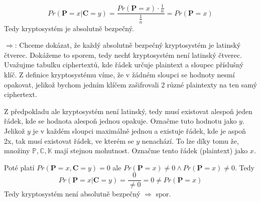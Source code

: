\documentclass[12pt, a4paper]{article}
\begin{document}
\[
Pr(\mathbf{P}=x \vert \mathbf{C}=y) = \frac{Pr(\mathbf{P}=x) \cdot \frac{1}{n}}{\frac{1}{n}} = Pr(\mathbf{P}=x)
\]
Tedy kryptosystém je absolutně bezpečný.

$\Rightarrow$: Chceme dokázat, že každý absolutně bezpečný kryptosystém je latinský čtverec. Dokážeme to sporem, tedy nechť kryptosystém není latinský čtverec. Uvažujme tabulku ciphertextů, kde řádek určuje plaintext a sloupec příslušný klíč. Z definice kryptosystému víme, že v žádném sloupci se hodnoty nesmí opakovat, jelikož bychom jedním klíčem zašifrovali 2 různé plaintexty na ten samý ciphertext.

Z předpokladu ale kryptosystém není latinský, tedy musí existovat alespoň jeden řádek, kde se hodnota alespoň jednou opakuje. Označme tuto hodnotu jako $y$. Jelikož $y$ je v každém sloupci maximálně jednou a existuje řádek, kde je aspoň 2x, tak musí existovat řádek, ve kterém se $y$ nenachází. To lze díky tomu že, množiny $\mathbb{P}, \mathbb{C}, \mathbb{K}$ mají stejnou mohutnost. Označme tento řádek (plaintext) jako $x$.

Poté platí $Pr(\mathbf{P}=x, \mathbf{C}=y) = 0$ ale  $Pr(\mathbf{P}=x) \neq 0 \land Pr(\mathbf{P}=x) \neq 0$. Tedy
\[
Pr(\mathbf{P}=x \vert \mathbf{C}=y) = \frac{0}{\neq 0} = 0 \neq Pr(\mathbf{P}=x)
\]
Tedy kryptosystém není absolutně bezpečný $\Rightarrow$ spor.

\section{}
\end{document}
